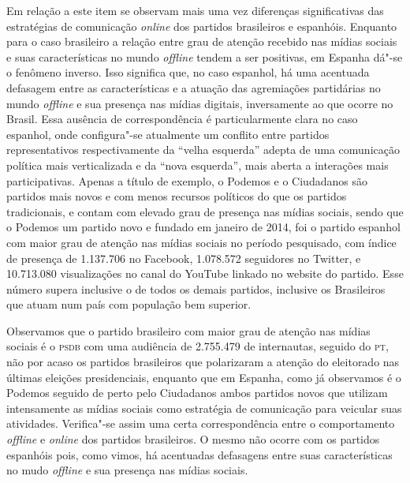 Em relação a este item se observam mais uma vez diferenças
significativas das estratégias de comunicação \textit{online} dos partidos
brasileiros e espanhóis. Enquanto para o caso brasileiro a relação entre
grau de atenção recebido nas mídias sociais e suas características no
mundo \textit{offline} tendem a ser positivas, em Espanha dá"-se o fenômeno
inverso. Isso significa que, no caso espanhol, há uma acentuada
defasagem entre as características e a atuação das agremiações
partidárias no mundo \textit{offline} e sua presença nas mídias digitais,
inversamente ao que ocorre no Brasil. Essa ausência de correspondência é
particularmente clara no caso espanhol, onde configura"-se atualmente um
conflito entre partidos representativos respectivamente da ``velha
esquerda'' adepta de uma comunicação política mais verticalizada e da
``nova esquerda'', mais aberta a interações mais participativas. Apenas
a título de exemplo, o Podemos e o Ciudadanos são partidos mais novos e
com menos recursos políticos do que os partidos tradicionais, e contam
com elevado grau de presença nas mídias sociais, sendo que o Podemos um
partido novo e fundado em janeiro de 2014, foi o partido espanhol com
maior grau de atenção nas mídias sociais no período pesquisado, com
índice de presença de 1.137.706 no Facebook, 1.078.572 seguidores no
Twitter, e 10.713.080 visualizações no canal do YouTube linkado no
website do partido. Esse número supera inclusive o de todos os demais
partidos, inclusive os Brasileiros que atuam num país com população bem
superior.

Observamos que o partido brasileiro com maior grau
de atenção nas mídias sociais é o \textsc{psdb} com uma audiência de 2.755.479 de
internautas, seguido do \textsc{pt}, não por acaso os partidos brasileiros que
polarizaram a atenção do eleitorado nas últimas eleições presidenciais,
enquanto que em Espanha, como já observamos é o Podemos seguido de perto
pelo Ciudadanos ambos partidos novos que utilizam intensamente as mídias
sociais como estratégia de comunicação para veicular suas atividades.
Verifica"-se assim uma certa correspondência entre o comportamento
\textit{offline} e \textit{online} dos partidos brasileiros. O mesmo não ocorre com os
partidos espanhóis pois, como vimos, há acentuadas defasagens entre suas
características no mudo \textit{offline} e sua presença nas mídias sociais.

